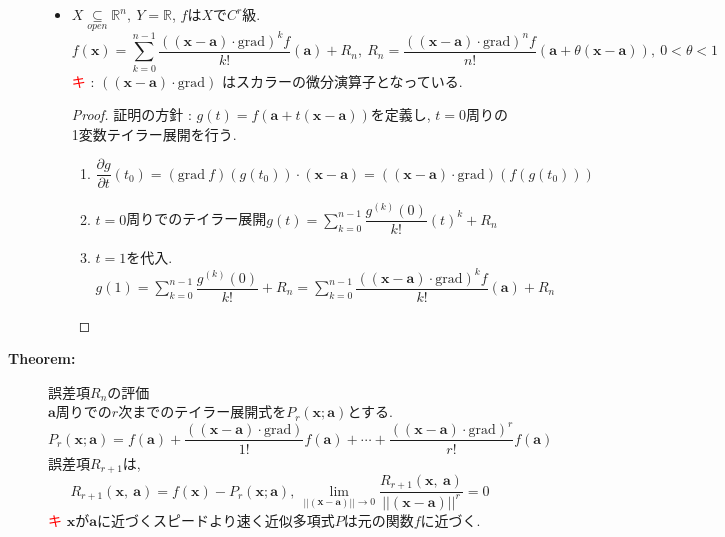 \documentclass[dvipdfmx]{jsarticle}
\newcommand{\point}{\textcircled{\textcolor{red}{\scriptsize キ}} }
\begin{document}
\begin{description}
\begin{itemize}
            \item $X \underset{open}{\subseteq} \mathbb{R}^n,\ Y = \mathbb{R}$, $f$は$X$で$C^r$級.
                $$ f(\bm{x}) = \sum_{k=0}^{n-1} \dfrac{( (\bm{x} - \bm{a}) \cdot \mathrm{grad})^k f}{k!}(\bm{a}) + R_n,\ R_n = \dfrac{( (\bm{x} - \bm{a}) \cdot \mathrm{\mathrm{grad}})^n f}{n!}(\bm{a}+ \theta (\bm{x} - \bm{a})),\ 0 < \theta < 1$$
                \point : $( (\bm{x} - \bm{a}) \cdot \mathrm{\mathrm{grad}})$ はスカラーの微分演算子となっている. \\
                \begin{proof} 証明の方針 : $g(t) = f(\bm{a} + t(\bm{x} - \bm{a}))$を定義し, $t=0$周りの1変数テイラー展開を行う.
                    \begin{enumerate}
                        \item $\dfrac{\partial g}{\partial t}(t_0) = (\mathrm{grad} \ f)(g(t_0)) \cdot (\bm{x} - \bm{a}) = ((\bm{x} - \bm{a}) \cdot \mathrm{grad})(f(g(t_0)))$
                        \item $t=0$周りでのテイラー展開$g(t) = \displaystyle \sum_{k = 0}^{n-1} \dfrac{g^{(k)}(0)}{k!}(t)^k + R_n$
                        \item $t=1$を代入. $g(1) = \displaystyle \sum_{k = 0}^{n-1} \dfrac{g^{(k)}(0)}{k!} + R_n = \displaystyle \sum_{k = 0}^{n-1} \dfrac{( (\bm{x} - \bm{a}) \cdot \mathrm{grad})^k f}{k!}(\bm{a}) + R_n$
                    \end{enumerate}
                \end{proof}
        \end{itemize}
    
    \item[\bf{Theorem:}] 誤差項$R_n$の評価 \\
        $\bm{a}$周りでの$r$次までのテイラー展開式を$P_r(\bm{x}; \bm{a})$とする.
            $$ P_r(\bm{x}; \bm{a}) = f(\bm{a}) + \dfrac{( (\bm{x} - \bm{a}) \cdot \mathrm{\mathrm{grad}})}{1!}f(\bm{a}) + \cdots + \dfrac{( (\bm{x} - \bm{a}) \cdot \mathrm{\mathrm{grad}})^r}{r!}f(\bm{a}) $$
        誤差項$R_{r+1}$は, 
        $$ R_{r+1}(\bm{x},\ \bm{a}) = f(\bm{x}) - P_r(\bm{x}; \bm{a}),\ \lim_{||(\bm{x} - \bm{a})|| \to 0}  \dfrac{ R_{r+1}(\bm{x},\ \bm{a})}{||(\bm{x} - \bm{a})||^r} = 0$$
        \point $\bm{x}$が$\bm{a}$に近づくスピードより速く近似多項式$P$は元の関数$f$に近づく.
\end{description}
\end{document}

